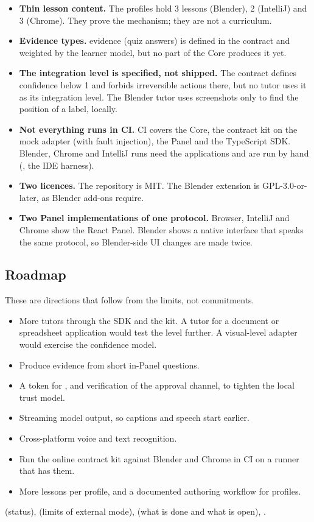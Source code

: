 \begin{itemize}[leftmargin=1.2em]
  \item \textbf{Thin lesson content.} The profiles hold 3 lessons (Blender), 2 (IntelliJ) and 3 (Chrome). They prove the mechanism; they are not a curriculum.
  \item \textbf{Evidence types.}  evidence (quiz answers) is defined in the contract and weighted by the learner model, but no part of the Core produces it yet.
  \item \textbf{The  integration level is specified, not shipped.} The contract defines confidence below 1 and forbids irreversible actions there, but no tutor uses it as its integration level. The Blender tutor uses screenshots only to find the position of a label, locally.
  \item \textbf{Not everything runs in CI.} CI covers the Core, the contract kit on the mock adapter (with fault injection), the Panel and the TypeScript SDK. Blender, Chrome and IntelliJ runs need the applications and are run by hand (, the IDE harness).
  \item \textbf{Two licences.} The repository is MIT. The Blender extension is GPL-3.0-or-later, as Blender add-ons require.
  \item \textbf{Two Panel implementations of one protocol.} Browser, IntelliJ and Chrome show the React Panel. Blender shows a native interface that speaks the same  protocol, so Blender-side UI changes are made twice.
\end{itemize}

\subsection{Roadmap}

These are directions that follow from the limits, not commitments.

\begin{itemize}[leftmargin=1.2em]
  \item More tutors through the SDK and the kit. A tutor for a document or spreadsheet application would test the  level further. A visual-level adapter would exercise the confidence model.
  \item Produce  evidence from short in-Panel questions.
  \item A token for , and verification of the approval channel, to tighten the local trust model.
  \item Streaming model output, so captions and speech start earlier.
  \item Cross-platform voice and text recognition.
  \item Run the online contract kit against Blender and Chrome in CI on a runner that has them.
  \item More lessons per profile, and a documented authoring workflow for profiles.
\end{itemize}

\begin{wherebox}
 (status),  (limits of external mode),  (what is done and what is open), .
\end{wherebox}

